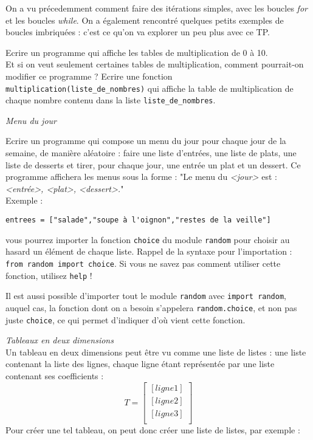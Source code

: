 

On a vu précedemment comment faire des itérations simples, avec les boucles \textit{for} et les boucles \textit{while}. On a également rencontré quelques petits exemples de boucles imbriquées : c'est ce qu'on va explorer un peu plus avec ce TP.

\ques Ecrire un programme qui affiche les tables de multiplication de 0 à 10. \\
 Et si on veut seulement certaines tables de multiplication, comment pourrait-on modifier ce programme ? Ecrire une fonction \texttt{multiplication(liste\_de\_nombres)} qui affiche la table de multiplication de chaque nombre contenu dans la liste \texttt{liste\_de\_nombres}.

\ques \textit{Menu du jour}

Ecrire un programme qui compose un menu du jour pour chaque jour de la semaine, de manière aléatoire : faire une liste d'entrées, une liste de plats, une liste de desserts et tirer, pour chaque jour, une entrée un plat et un dessert. Ce programme affichera les menus sous la forme : "Le menu du \textit{<jour>} est : \textit{<entrée>, <plat>, <dessert>.}"\\

Exemple :
\begin{verbatim}
entrees = ["salade","soupe à l'oignon","restes de la veille"]
\end{verbatim}

 vous pourrez importer la fonction \texttt{choice} du module \texttt{random} pour choisir au hasard un élément de chaque liste. Rappel de la syntaxe pour l'importation : \texttt{from random import choice}. Si vous ne savez pas comment utiliser cette fonction, utilisez \texttt{help} !

Il est aussi possible d'importer tout le module \texttt{random} avec \texttt{import random}, auquel cas, la fonction dont on a besoin s'appelera \texttt{random.choice}, et non pas juste \texttt{choice}, ce qui permet d'indiquer d'où vient cette fonction.

\ques \textit{Tableaux en deux dimensions}\\
	Un tableau en deux dimensions peut être vu comme une liste de listes : une liste contenant la liste des lignes, chaque ligne étant représentée par une liste contenant ses coefficients : \[
		T = \begin{bmatrix}
			[ligne 1] \\
			[ligne 2] \\
			[ligne 3] \\
		\end{bmatrix}
	\]
	Pour créer une tel tableau, on peut donc créer une liste de listes, par exemple :

